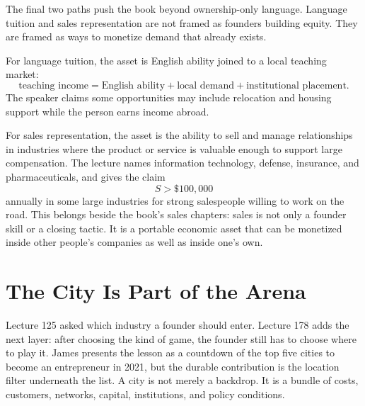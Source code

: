 \documentclass[11pt,oneside]{book}
\begin{document}
The final two paths push the book beyond ownership-only language. Language tuition and sales representation are not framed as founders building equity. They are framed as ways to monetize demand that already exists.

For language tuition, the asset is English ability joined to a local teaching market:
\[
\text{teaching income}
=
\text{English ability}
+
\text{local demand}
+
\text{institutional placement}.
\]
The speaker claims some opportunities may include relocation and housing support while the person earns income abroad.

For sales representation, the asset is the ability to sell and manage relationships in industries where the product or service is valuable enough to support large compensation. The lecture names information technology, defense, insurance, and pharmaceuticals, and gives the claim
\[
S>\$100{,}000
\]
annually in some large industries for strong salespeople willing to work on the road. This belongs beside the book's sales chapters: sales is not only a founder skill or a closing tactic. It is a portable economic asset that can be monetized inside other people's companies as well as inside one's own.


\section{The City Is Part of the Arena}

Lecture 125 asked which industry a founder should enter. Lecture 178 adds the next layer: after choosing the kind of game, the founder still has to choose where to play it. James presents the lesson as a countdown of the top five cities to become an entrepreneur in 2021, but the durable contribution is the location filter underneath the list. A city is not merely a backdrop. It is a bundle of costs, customers, networks, capital, institutions, and policy conditions.
\end{document}
